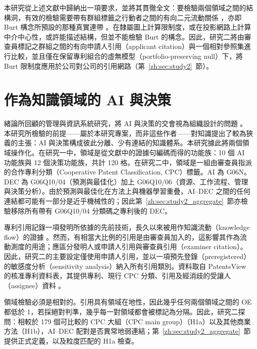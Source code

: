 本研究從上述文獻中歸納出一項要求，並將其貫徹全文：要檢驗兩個領域之間的結構洞，有效的檢驗需要帶有群組標籤之行動者之間的有向二元流動關係 \citep{gould1989structures}，亦即 Burt 構念所預設的那種真實連帶 \citep{burt2004structural}。在隸屬圖上計算限制度，或在投影網路上計算中介中心性，或許能描述結構，但並不能檢驗 Burt 的構念。因此，研究二將由審查員標記之群組之間的有向申請人引用（applicant citation）與一個相對參照集進行比較，並且僅在保留專利組合的虛無模型（portfolio-preserving null）下，將 Burt 限制度應用於公司對公司的引用網路（第~\ref{zh:sec:study2}~節）。

\section{作為知識領域的 AI 與決策}
\label{zh:sec:theory_domains}

緒論所回顧的管理與資訊系統研究，將 AI 與決策的交會視為組織設計的問題 \citep{shrestha2019organizational,raisch2021artificial,jarrahi2018artificial,berente2021managing}。本研究所檢驗的前提——屬於本研究專案，而非這些作者——對知識提出了較為狹義的主張：AI 與決策構成彼此分離、少有連結的知識體系。本研究據此將兩個領域操作化。在研究一中，領域是從文獻中的證據句編碼而得的功能族：10 個 AI 功能族與 12 個決策功能族，共計 120 格。在研究二中，領域是一組由審查員指派的合作專利分類（Cooperative Patent Classification, CPC）標籤。AI 為 G06N。DEC 為 G06Q10/04（預測與最佳化）加上 G06Q10/06（資源、工作流程、管理與決策分析）。由於預測與最佳化在方法上與機器學習重疊，AI--DEC 之間的任何連結都可能有一部分是近乎機械性的；因此第~\ref{zh:sec:study2_aggregate}~節亦檢驗移除所有帶有 G06Q10/04 分類碼之專利後的 DEC。

專利引用記錄一項發明所依據的先前技術，長久以來被用作知識流動（knowledge flow）的證據 \citep{jaffe1993geographic}。然而，有相當大比例的引用是由審查員加入的，這影響其作為流動測度的用途；應區分發明人或申請人引用與審查員引用（examiner citation）\citep{alcacer2006patent}。因此，研究二的主要設定僅使用申請人引用，並以一項預先登錄（preregistered）的敏感度分析（sensitivity analysis）納入所有引用類別。資料取自 PatentsView 的核准專利資料表，其提供專利、現行 CPC 分類、引用及經消歧的受讓人（assignee）資料 \citep{uspto2026patentsview}。

領域檢驗必須是相對的。引用具有領域在地性，因此幾乎任何兩個領域之間的 OE 都低於 1，若採絕對判準，幾乎每一對領域都會被標記為分隔。因此，研究二探問：相較於 179 個可比較的 CPC 大組（CPC main group）（H1a）以及其他商業方法（H1b），AI--DEC 配對是否異常地弱連結；第~\ref{zh:sec:study2_aggregate}~節提供正式定義，以及粒度匹配的 H1a 檢查。

